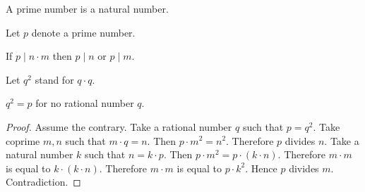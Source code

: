 \documentclass{article}
\begin{document}
  \begin{forthel}
    \begin{signature}
      A prime number is a natural number.
    \end{signature}

    Let $p$ denote a prime number.

    \begin{axiom}
      If $p \mid n \cdot m$ then $p \mid n$ or $p \mid m$.
    \end{axiom}

    Let $q^{2}$ stand for $q \cdot q$.

    \begin{proposition}
      $q^{2} = p$ for no rational number $q$.
    \end{proposition}
    \begin{proof}
      Assume the contrary.
      Take a rational number $q$ such that $p = q^{2}$.
      Take coprime $m,n$ such that $m \cdot q = n$.
      Then $p \cdot m^{2} = n^{2}$.
      Therefore $p$ divides $n$.
      Take a natural number $k$ such that $n = k \cdot p$.
      Then $p \cdot m^{2} = p \cdot (k \cdot n)$.
      Therefore $m \cdot m$ is equal to $k \cdot (k \cdot n)$.
      Therefore $m \cdot m$ is equal to $p \cdot k^{2}$.
      Hence $p$ divides $m$.
      Contradiction.
    \end{proof}
  \end{forthel}
\end{document}
